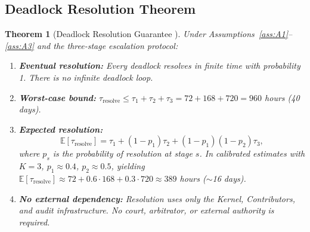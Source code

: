 \documentclass[12pt,a4paper]{article}
\newtheorem{theorem}{Theorem}[section]
\theoremstyle{definition}
\newcommand{\E}{\mathbb{E}}
\begin{document}
\subsection{Deadlock Resolution Theorem}
\begin{theorem}[Deadlock Resolution Guarantee ]
\label{thm:deadlock}
Under Assumptions~\ref{ass:A1}--\ref{ass:A3} and the three-stage escalation protocol:
\begin{enumerate}[label=(\roman*)]
    \item \textbf{Eventual resolution:} Every deadlock resolves in finite time with probability 1. There is no infinite deadlock loop.
    \item \textbf{Worst-case bound:} $\tau_{\text{resolve}} \leq \tau_1 + \tau_2 + \tau_3 = 72 + 168 + 720 = 960$ hours (40 days).
    \item \textbf{Expected resolution:}
    \begin{equation}
        \E[\tau_{\text{resolve}}] = \tau_1 + (1 - p_1)\tau_2 + (1-p_1)(1-p_2)\tau_3,
        \label{eq:expected_resolve}
    \end{equation}
    where $p_s$ is the probability of resolution at stage $s$. In calibrated estimates with $K=3$, $p_1 \approx 0.4$, $p_2 \approx 0.5$, yielding $\E[\tau_{\text{resolve}}] \approx 72 + 0.6 \cdot 168 + 0.3 \cdot 720 \approx 389$ hours ($\sim$16 days).
    \item \textbf{No external dependency:} Resolution uses only the Kernel, Contributors, and audit infrastructure. No court, arbitrator, or external authority is required.
\end{enumerate}
\end{theorem}
\end{document}
